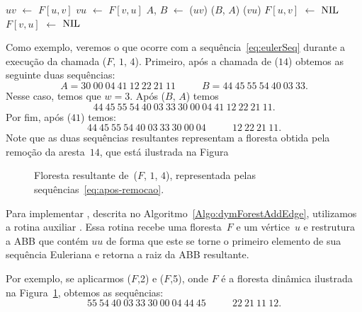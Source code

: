 \begin{algorithm}[htb]
\caption{\dymForestDelEdge($F$, $u$, $v$)}
\label{Algo:dymForestDelEdge}
\begin{algorithmic}[1]
\State $uv$ $\gets$ $F[u,v]$
\State $vu$ $\gets$ $F[v,u]$ 
\State $A$, $B$ $\gets$ \treapSplit($uv$)
\State \treapJoin($B$, $A$)
\State \treapSplit($vu$)
\State $F[u,v]$ $\gets$ $\text{NIL}{}$
\State $F[v,u]$ $\gets$ $\text{NIL}{}$
\end{algorithmic}
\end{algorithm}

Como exemplo, veremos o que ocorre com a sequência~\eqref{eq:eulerSeq} durante a execução da chamada \dymForestDelEdge($F$, $1$, $4$).
Primeiro, após a chamada de \treapSplit($14$) obtemos as seguinte duas sequências:
\begin{equation}
A = 30~00~04~41~12~22~21~11~~~~~~~~~~~~B = 44~45~55~54~40~03~33.\nonumber
\end{equation}
Nesse caso, temos que $w=3$. Após \treapJoin($B$, $A$) temos
\begin{equation}
 44~45~55~54~40~03~33~30~00~04~41~12~22~21~11.\nonumber
\end{equation}
Por fim, após \treapSplit($41$) temos: 
\begin{equation}
 44~45~55~54~40~03~33~30~00~04~~~~~~~~~~~~12~22~21~11.\label{eq:apos-remocao}
\end{equation}
Note que as duas sequências resultantes representam a floresta obtida pela remoção da aresta~$14$, que está ilustrada na Figura

\begin{figure}[htb]
\centering

\caption{Floresta resultante de~\dymForestDelEdge($F$, $1$, $4$), representada pelas sequências~\eqref{eq:apos-remocao}.}
\label{fig:algorit-del-pos}
\end{figure}

Para implementar \dymForestAddEdge{}, descrita no Algoritmo~\ref{Algo:dymForestAddEdge}, utilizamos a rotina auxiliar \ETmovetofront{}.
Essa rotina recebe uma floresta~$F$ e um vértice~$u$ e restrutura a ABB que contém $uu$ de forma que este se torne o primeiro elemento de sua sequência Euleriana e retorna a raiz da ABB resultante. 

Por exemplo, se aplicarmos \ETmovetofront($F$,2) e \ETmovetofront($F$,5), onde $F$ é a floresta dinâmica ilustrada na Figura~\ref{fig:algorit-del-pos}, obtemos as sequências:
\begin{equation}
55~54~40~03~33~30~00~04~44~45~~~~~~~~~~~~22~21~11~12.\label{eq:apos-moveToFront}
\end{equation}

